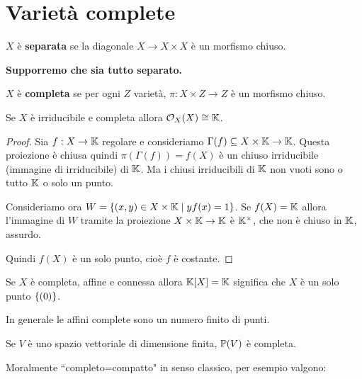 \section{Variet\`a complete}

\begin{definition}
$X$ \`e \textbf{separata} se la diagonale $X\to X\times X$ \`e un morfismo chiuso.
\end{definition}
\begin{center}
	\textbf{Supporremo che sia tutto separato.}
\end{center}

\begin{definition}
$X$ \`e \textbf{completa} se per ogni $Z$ variet\`a, $\pi:X\times Z\to Z$ \`e un morfismo chiuso.
\end{definition}

\begin{remark}\label{ReRegolariSuCompleteIrriducibiliSonoCostanti}
Se $X$ \`e irriducibile e completa allora $\mathcal{O}_X(X)\cong \mathbb{K}$.
\end{remark}
\begin{proof}
Sia $f:X\to \mathbb{K}$ regolare e consideriamo $\Gamma(f)\subseteq X\times \mathbb{K}\to \mathbb{K}$. Questa proiezione \`e chiusa quindi $\pi(\Gamma(f))=f(X)$ \`e un chiuso irriducibile (immagine di irriducibile) di $\mathbb{K}$. Ma i chiusi irriducibili di $\mathbb{K}$ non vuoti sono o tutto $\mathbb{K}$ o solo un punto.

Consideriamo ora $W=\left\{{(x,y)\in X\times \mathbb{K}\mid yf(x)=1}\right\}$. Se $f(X)=\mathbb{K}$ allora l'immagine di $W$ tramite la proiezione $X\times \mathbb{K}\to \mathbb{K}$ \`e $\mathbb{K}^\times$, che non \`e chiuso in $\mathbb{K}$, assurdo.

Quindi $f(X)$ \`e un solo punto, cio\`e $f$ \`e costante.
\end{proof}
\begin{corollary}
Se $X$ \`e completa, affine e connessa allora $\mathbb{K}[X]=\mathbb{K}$ significa che $X$ \`e un solo punto $\left\{{(0)}\right\}$.

In generale le affini complete sono un numero finito di punti.
\end{corollary}

\begin{theorem}\label{ThProiettiviSonoCompleti}
Se $V$ \`e uno spazio vettoriale di dimensione finita, $\mathbb{P}(V)$ \`e completa.
\end{theorem}

\begin{center}
	Moralmente ``completo=compatto" in senso classico, per esempio valgono:
\end{center}

